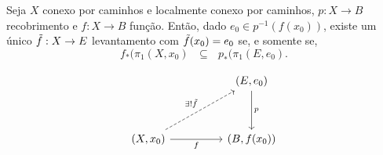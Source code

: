 \begin{thm}
    Seja $X$ conexo por caminhos e localmente conexo por caminhos, $p : X \rightarrow B$ recobrimento e $f : X \rightarrow B$ função. Então, dado $e_0 \in p^{-1}(f(x_0))$, existe um único $\Tilde{f} : X \rightarrow E$ levantamento com $\Tilde{f}(x_0) = e_0$ se, e somente se, 
    \begin{equation}
        f_{*}(\pi_{1}(X, x_0) \text{ }\subseteq \text{ } p_{*}(\pi_{1}(E, e_0).
    \end{equation}

    \[\begin{tikzcd}
                                                                            &  & {(E, e_0)}     \arrow[dd, "p"] \\
                                                                            &  &                               \\
    {(X, x_0)} \arrow[rr, "f"'] \arrow[rruu, "\exists ! \Tilde{f}", dashed] &  & {(B, f(x_0))}             
    \end{tikzcd}\]
\end{thm}

